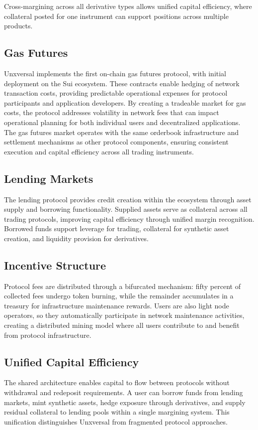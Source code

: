\documentclass[12pt]{article}
\begin{document}
Cross-margining across all derivative types allows unified capital efficiency, where collateral posted for one instrument can support positions across multiple products.

\subsection{Gas Futures}
Unxversal implements the first on-chain gas futures protocol, with initial deployment on the Sui ecosystem. These contracts enable hedging of network transaction costs, providing predictable operational expenses for protocol participants and application developers. By creating a tradeable market for gas costs, the protocol addresses volatility in network fees that can impact operational planning for both individual users and decentralized applications. The gas futures market operates with the same orderbook infrastructure and settlement mechanisms as other protocol components, ensuring consistent execution and capital efficiency across all trading instruments.

\subsection{Lending Markets}
The lending protocol provides credit creation within the ecosystem through asset supply and borrowing functionality. Supplied assets serve as collateral across all trading protocols, improving capital efficiency through unified margin recognition. Borrowed funds support leverage for trading, collateral for synthetic asset creation, and liquidity provision for derivatives.

\subsection{Incentive Structure}
Protocol fees are distributed through a bifurcated mechanism: fifty percent of collected fees undergo token burning, while the remainder accumulates in a treasury for infrastructure maintenance rewards. Users are also light node operators, so they automatically participate in network maintenance activities, creating a distributed mining model where all users contribute to and benefit from protocol infrastructure.

\subsection{Unified Capital Efficiency}
The shared architecture enables capital to flow between protocols without withdrawal and redeposit requirements. A user can borrow funds from lending markets, mint synthetic assets, hedge exposure through derivatives, and supply residual collateral to lending pools within a single margining system. This unification distinguishes Unxversal from fragmented protocol approaches.
\end{document}
